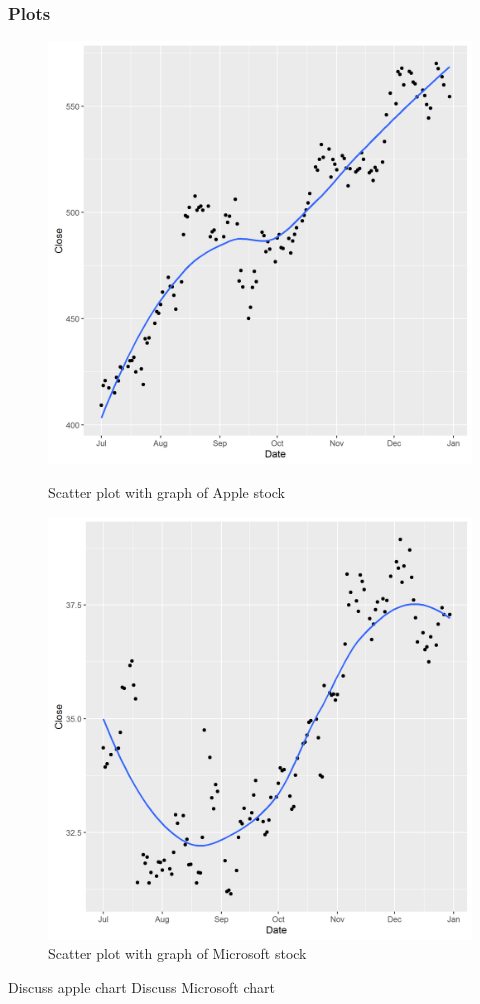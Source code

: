\documentclass[paper=a4, fontsize=11pt]{scrartcl} %
\numberwithin{equation}{section} %
\numberwithin{figure}{section} %
\numberwithin{table}{section} %
\begin{document}
\subsubsection{Plots}
\begin{figure}[!htb]
  \includegraphics[width=\linewidth]{graph/AAPL6.png}
  \caption{Scatter plot with graph of Apple stock}
\endminipage\hfill
{}
  \includegraphics[width=\linewidth]{graph/MSFT6.png}
  \caption{Scatter plot with graph of Microsoft stock}
\endminipage\hfill

\end{figure}
Discuss apple chart
Discuss Microsoft chart
\end{document}
